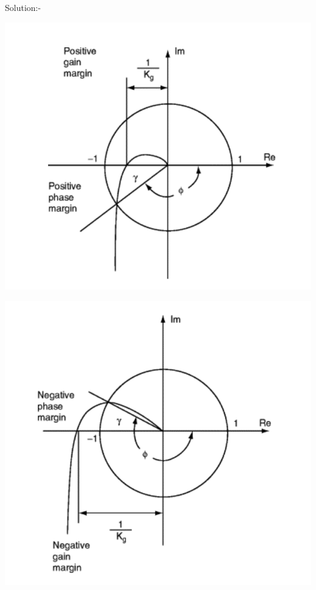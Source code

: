 \documentclass[journal,12pt,twocolumn]{IEEEtran}
\begin{document}
\begin{frame}{Solution:- }
\begin{frame}{}
\end{frame}

\begin{frame}{}
\begin{center}
    \includegraphics[scale = 0.25]{./figs/fig-2.png}
\end{center}
\end{frame}

\begin{frame}{}
\begin{center}
    \includegraphics[scale = 0.25]{./figs/fig-3.png}
\end{center}
\end{frame}



\end{frame}
\end{document}
